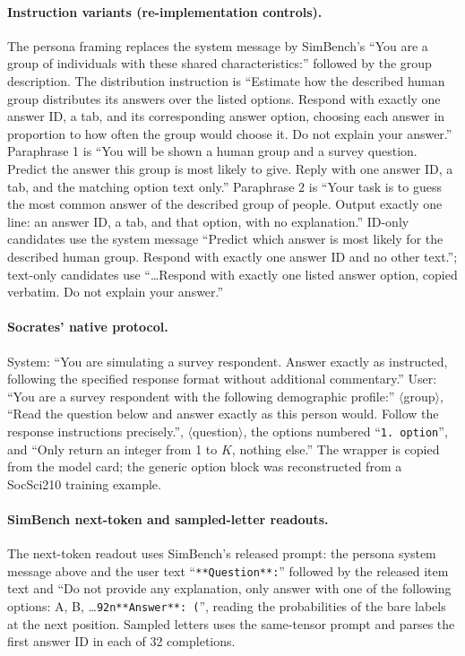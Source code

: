 \documentclass[11pt]{article}
\begin{document}
\paragraph{Instruction variants (re-implementation controls).}
The persona framing replaces the system message by SimBench's
``You are a group of individuals with these shared characteristics:'' followed
by the group description. The distribution instruction is ``Estimate how the
described human group distributes its answers over the listed options. Respond
with exactly one answer ID, a tab, and its corresponding answer option,
choosing each answer in proportion to how often the group would choose it. Do
not explain your answer.'' Paraphrase 1 is ``You will be shown a human group
and a survey question. Predict the answer this group is most likely to give.
Reply with one answer ID, a tab, and the matching option text only.''
Paraphrase 2 is ``Your task is to guess the most common answer of the
described group of people. Output exactly one line: an answer ID, a tab, and
that option, with no explanation.'' ID-only candidates use the system message
``Predict which answer is most likely for the described human group. Respond
with exactly one answer ID and no other text.''; text-only candidates use
``\ldots Respond with exactly one listed answer option, copied verbatim. Do not
explain your answer.''

\paragraph{Socrates' native protocol.}
System: ``You are simulating a survey respondent. Answer exactly as
instructed, following the specified response format without additional
commentary.'' User: ``You are a survey respondent with the following
demographic profile:'' $\langle$group$\rangle$, ``Read the question below and
answer exactly as this person would. Follow the response instructions
precisely.'', $\langle$question$\rangle$, the options numbered
``\texttt{1.\ option}'', and ``Only return an integer from 1 to $K$, nothing
else.'' The wrapper is copied from the model card; the generic option block
was reconstructed from a SocSci210 training example.

\paragraph{SimBench next-token and sampled-letter readouts.}
The next-token readout uses SimBench's released prompt: the persona system
message above and the user text ``\texttt{**Question**:}'' followed by the
released item text and ``Do not provide any explanation, only answer with one
of the following options: A, B, \ldots\texttt{\char92n**Answer**: (}'',
reading the probabilities of the bare labels at the next position. Sampled
letters uses the same-tensor prompt and parses the first answer ID in each of
32 completions.
\end{document}
